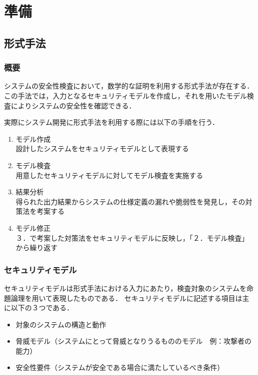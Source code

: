 \documentclass[journal]{IEEEtran}
\begin{document}
\section{準備}

\subsection{形式手法}
\subsubsection{概要}
システムの安全性検査において，数学的な証明を利用する形式手法が存在する．
この手法では，入力となるセキュリティモデルを作成し，それを用いたモデル検査によりシステムの安全性を確認できる．

実際にシステム開発に形式手法を利用する際には以下の手順を行う．
\begin{enumerate}
\item モデル作成\\
設計したシステムをセキュリティモデルとして表現する
\item モデル検査\\
用意したセキュリティモデルに対してモデル検査を実施する
\item 結果分析\\
得られた出力結果からシステムの仕様定義の漏れや脆弱性を発見し，その対策法を考案する
\item モデル修正\\
３．で考案した対策法をセキュリティモデルに反映し，「２．モデル検査」から繰り返す
\end{enumerate}

\subsubsection{セキュリティモデル}
セキュリティモデルは形式手法における入力にあたり，検査対象のシステムを命題論理を用いて表現したものである．
セキュリティモデルに記述する項目は主に以下の３つである．
\begin{itemize}
\item 対象のシステムの構造と動作
\item 脅威モデル（システムにとって脅威となりうるもののモデル　例：攻撃者の能力）
\item 安全性要件（システムが安全である場合に満たしているべき条件）
\end{itemize}
\end{document}
